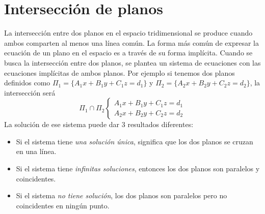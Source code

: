 \documentclass{article}
\begin{document}
\section*{Intersección de planos}
La intersección entre dos planos en el espacio tridimensional se produce cuando ambos comparten al menos una línea común. La forma más común de expresar la ecuación de un plano en el espacio es a través de su forma implícita. Cuando se busca la intersección entre dos planos, se plantea un sistema de ecuaciones con las ecuaciones implícitas de ambos planos.
Por ejemplo si tenemos dos planos definidos como $\Pi_1 = \{ A_1x+B_1y+ C_1z = d_1\}$ y $\Pi_2 = \{ A_2x+B_2y+ C_2z = d_2\}$, la intersección será
\[
\Pi_1 \cap \Pi_2
\begin{cases}
A_1x+B_1y+ C_1z = d_1 \\
A_2x+B_2y+ C_2z = d_2
\end{cases}
\]
La solución de ese sistema puede dar $3$ resultados diferentes:
\begin{itemize}
\item 
Si el sistema tiene \emph{una solución única}, significa que los dos planos se cruzan en una línea.
\item 
Si el sistema tiene \emph{infinitas soluciones}, entonces los dos planos son paralelos y coincidentes.
\item 
Si el sistema \emph{no tiene solución}, los dos planos son paralelos pero no coincidentes en ningún punto.
\end{itemize}

\newpage
\end{document}
